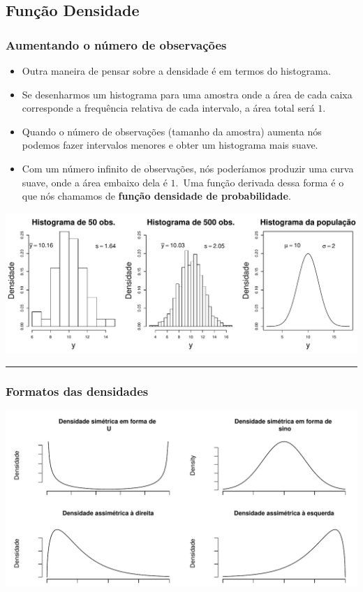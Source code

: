 \documentclass[]{article}
\providecommand{\tightlist}{%
  \setlength{\itemsep}{0pt}\setlength{\parskip}{0pt}}
\begin{document}
\subsection{Função Densidade}\label{funcao-densidade}

\subsubsection{Aumentando o número de
observações}\label{aumentando-o-numero-de-observacoes}

\begin{itemize}
\tightlist
\item
  Outra maneira de pensar sobre a densidade é em termos do histograma.
\item
  Se desenharmos um histograma para uma amostra onde a área de cada
  caixa corresponde a frequência relativa de cada intervalo, a área
  total será \(1\).
\item
  Quando o número de observações (tamanho da amostra) aumenta nós
  podemos fazer intervalos menores e obter um histograma mais suave.
\item
  Com um número infinito de observações, nós poderíamos produzir uma
  curva suave, onde a área embaixo dela é \(1\).~Uma função derivada
  dessa forma é o que nós chamamos de \textbf{função densidade de
  probabilidade}.
\end{itemize}

\includegraphics{probability_files/figure-latex/histToPop-1.pdf}

\begin{center}\rule{0.5\linewidth}{\linethickness}\end{center}

\subsubsection{Formatos das densidades}\label{formatos-das-densidades}

\includegraphics[width=\textwidth]{probability_files/figure-latex/densities-1}
\end{document}
